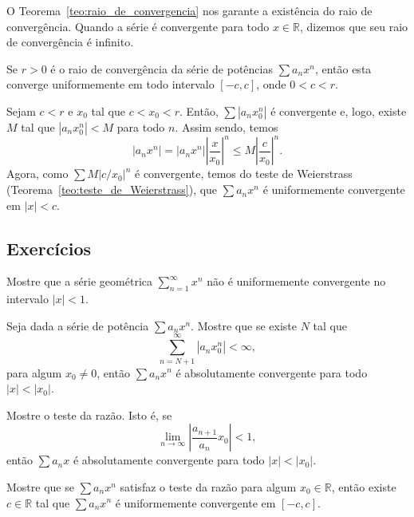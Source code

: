 \begin{obs}
  O Teorema~\ref{teo:raio_de_convergencia} nos garante a existência do raio de convergência. Quando a série é convergente para todo $x\in\mathbb{R}$, dizemos que seu raio de convergência é infinito.
\end{obs}

\begin{teo}
  Se $r>0$ é o raio de convergência da série de potências $\sum a_nx^n$, então esta converge uniformemente em todo intervalo $[-c, c]$, onde $0<c<r$.
\end{teo}
\begin{dem}
  Sejam $c<r$ e $x_0$ tal que $c<x_0<r$. Então, $\sum |a_nx_0^n|$ é convergente e, logo, existe $M$ tal que $|a_nx_0^n|<M$ para todo $n$. Assim sendo, temos
  \begin{equation}
    |a_nx^n| = |a_nx^n|\left|\frac{x}{x_0}\right|^n \leq M\left|\frac{c}{x_0}\right|^n.
  \end{equation}
Agora, como $\sum M|c/x_0|^n$ é convergente, temos do teste de Weierstrass (Teorema~\ref{teo:teste_de_Weierstrass}), que $\sum a_nx^n$ é uniformemente convergente em $|x|< c$.
\end{dem}


\subsection*{Exercícios}

\begin{exer}
  Mostre que a série geométrica $\sum_{n=1}^\infty x^n$ não é uniformemente convergente no intervalo $|x|<1$.
\end{exer}

\begin{exer}
  Seja dada a série de potência $\sum a_nx^n$. Mostre que se existe $N$ tal que
  \begin{equation}
    \sum_{n=N+1}^\infty |a_nx_0^n| < \infty,
  \end{equation}
para algum $x_0\neq 0$, então $\sum a_nx^n$ é absolutamente convergente para todo $|x|<|x_0|$.
\end{exer}

\begin{exer}
  Mostre o teste da razão. Isto é, se
  \begin{equation}
    \lim_{n\to\infty} \left|\frac{a_{n+1}}{a_n}x_0\right| < 1,
  \end{equation}
então $\sum a_nx$ é absolutamente convergente para todo $|x|<|x_0|$.
\end{exer}

\begin{exer}
  Mostre que se $\sum a_nx^n$ satisfaz o teste da razão para algum $x_0\in\mathbb{R}$, então existe $c\in\mathbb{R}$ tal que $\sum a_nx^n$ é uniformemente convergente em $[-c, c]$.
\end{exer}